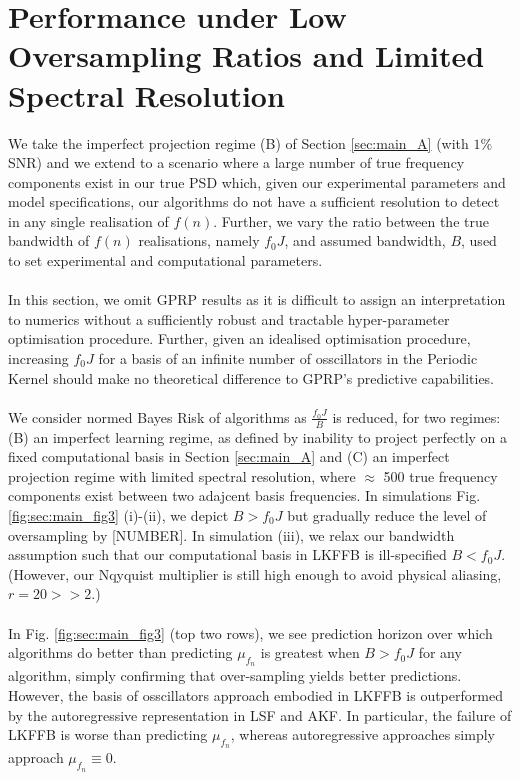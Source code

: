 \section{Performance under Low Oversampling Ratios and Limited Spectral Resolution} \label{sec:main_C}
We take the imperfect projection regime (B) of Section \ref{sec:main_A} (with $1\%$ SNR) and we extend to a scenario where a  large number of true frequency components exist in our true PSD which, given our experimental parameters and model specifications, our algorithms do not have a sufficient resolution to detect in any single realisation of $f(n)$. Further, we vary the ratio between the true bandwidth of $f(n)$ realisations, namely $f_0J$, and assumed bandwidth, $B$, used to set experimental and computational parameters. 
\\
\\
In this section, we omit GPRP results as it is difficult to assign an interpretation to numerics without a sufficiently robust and tractable hyper-parameter optimisation procedure. Further, given an idealised optimisation procedure, increasing $f_0J$ for a basis of an infinite number of osscillators in the Periodic Kernel should make no theoretical difference to GPRP's  predictive capabilities. 
\\
\\
We consider normed Bayes Risk of algorithms as $\frac{f_0J}{B}$ is reduced, for two regimes: (B) an imperfect learning regime, as defined by inability to project perfectly on a fixed computational basis in Section \ref{sec:main_A} and (C) an imperfect projection regime with limited spectral resolution, where $\approx$ 500 true frequency components exist between two adajcent basis frequencies. In simulations Fig. \ref{fig:sec:main_fig3} (i)-(ii), we depict $B > f_0J$ but gradually reduce the level of oversampling by [NUMBER]. In  simulation (iii), we relax our bandwidth assumption such that our computational basis in LKFFB is ill-specified $B < f_0J$. (However, our Nqyquist multiplier is still high enough to avoid physical aliasing, $r = 20 >> 2$.)
\\
\\
In Fig. \ref{fig:sec:main_fig3} (top two rows), we see prediction horizon over which algorithms do better than predicting $\mu_{f_n}$ is greatest when $B > f_0J$ for any algorithm, simply confirming that over-sampling yields better predictions. However, the basis of osscillators approach embodied in LKFFB is outperformed by the autoregressive representation in LSF and AKF. In particular, the failure of LKFFB is worse than predicting $\mu_{f_n}$, whereas autoregressive approaches simply approach $\mu_{f_n} \equiv 0$. 
